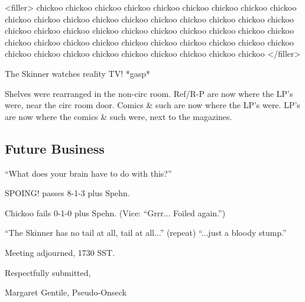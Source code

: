\documentclass[10pt]{article}
\newcommand{\ps}{ plus Spehn\xspace}
\begin{document}
<filler>
chickoo chickoo chickoo chickoo chickoo chickoo chickoo chickoo chickoo chickoo chickoo chickoo 
chickoo chickoo chickoo chickoo chickoo chickoo chickoo chickoo chickoo chickoo chickoo chickoo 
chickoo chickoo chickoo chickoo chickoo chickoo chickoo chickoo chickoo chickoo chickoo chickoo 
chickoo chickoo chickoo chickoo chickoo chickoo chickoo chickoo chickoo chickoo chickoo chickoo
</filler>

The Skinner watches reality TV! *gasp*

Shelves were rearranged in the non-circ room.
Ref/R-P are now where the LP's were, near the circ room door.
Comics & such are now where the LP's were.
LP's are now where the comics & such were, next to the magazines.

\subsection{Future Business}

``What does your brain have to do with this?''

SPOING! passes 8-1-3\ps.
 
Chickoo fails 0-1-0\ps.  (Vice: ``Grrr... Foiled again.'')

``The Skinner has no tail at all, tail at all...'' (repeat) ``...just a bloody stump.''

\vspace{12pt}

\noindent
Meeting adjourned, 1730 SST.

\vspace{18pt}

\centerline{Respectfully submitted,}
\centerline{Margaret Gentile, Pseudo-Onseck}
\end{document}
